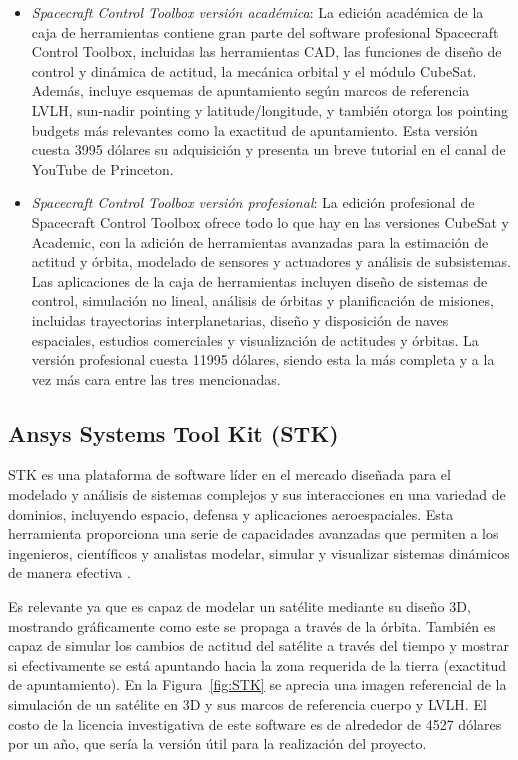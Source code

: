 \begin{itemize}
	\item \textit{Spacecraft Control Toolbox versión académica}: La edición académica de la caja de herramientas contiene gran parte del software profesional Spacecraft Control Toolbox, incluidas las herramientas CAD, las funciones de diseño de control y dinámica de actitud, la mecánica orbital y el módulo CubeSat. Además, incluye esquemas de apuntamiento según marcos de referencia LVLH, sun-nadir pointing y latitude/longitude, y también otorga los pointing budgets más relevantes como la exactitud de apuntamiento. Esta versión cuesta 3995 dólares su adquisición y presenta un breve tutorial en el canal de YouTube de Princeton.
	
	\item \textit{Spacecraft Control Toolbox versión profesional}: La edición profesional de Spacecraft Control Toolbox ofrece todo lo que hay en las versiones CubeSat y Academic, con la adición de herramientas avanzadas para la estimación de actitud y órbita, modelado de sensores y actuadores y análisis de subsistemas. Las aplicaciones de la caja de herramientas incluyen diseño de sistemas de control, simulación no lineal, análisis de órbitas y planificación de misiones, incluidas trayectorias interplanetarias, diseño y disposición de naves espaciales, estudios comerciales y visualización de actitudes y órbitas. La versión profesional cuesta 11995 dólares, siendo esta la más completa y a la vez más cara entre las tres mencionadas.
\end{itemize}


\subsection{Ansys Systems Tool Kit (STK)}

STK es una plataforma de software líder en el mercado diseñada para el modelado y análisis de sistemas complejos y sus interacciones en una variedad de dominios, incluyendo espacio, defensa y aplicaciones aeroespaciales. Esta herramienta proporciona una serie de capacidades avanzadas que permiten a los ingenieros, científicos y analistas modelar, simular y visualizar sistemas dinámicos de manera efectiva \cite{ref34}.

Es relevante ya que es capaz de modelar un satélite mediante su diseño 3D, mostrando gráficamente como este se propaga a través de la órbita. También es capaz de simular los cambios de actitud del satélite a través del tiempo y mostrar si efectivamente se está apuntando hacia la zona requerida de la tierra (exactitud de apuntamiento). En la Figura~\ref{fig:STK} se aprecia una imagen referencial de la simulación de un satélite en 3D y sus marcos de referencia cuerpo y LVLH. El costo de la licencia investigativa de este software es de alrededor de 4527 dólares por un año, que sería la versión útil para la realización del proyecto.

